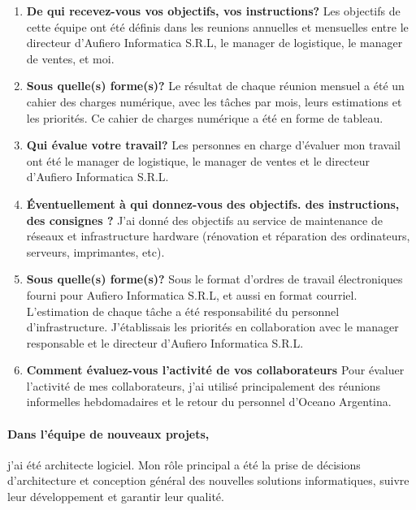 \documentclass{resume} %
\begin{document}
		\begin{enumerate}
		\item \textbf{De qui recevez-vous vos objectifs, vos instructions?}
			Les objectifs de cette équipe ont été définis dans les reunions annuelles et mensuelles entre le directeur d'Aufiero Informatica S.R.L, le manager de logistique, le manager de ventes, et moi.
		\item \textbf{Sous quelle(s) forme(s)?}
			Le résultat de chaque réunion mensuel a été un cahier des charges numérique, avec les tâches par mois, leurs estimations et les priorités. Ce cahier de charges numérique  a été en forme de tableau.
		\item \textbf{Qui évalue votre travail?}
			Les personnes en charge d'évaluer mon travail ont été  le manager de logistique, le manager de ventes et le directeur d'Aufiero Informatica S.R.L. 
		\item  \textbf{Éventuellement à qui donnez-vous des objectifs. des instructions, des consignes ?}
			J'ai donné des objectifs au service de maintenance de réseaux et infrastructure hardware (rénovation et réparation des ordinateurs, serveurs, imprimantes, etc).
		\item \textbf{Sous quelle(s) forme(s)?}
			Sous le format d'ordres de travail électroniques fourni pour Aufiero Informatica S.R.L, et aussi en format courriel. L'estimation de chaque tâche a été responsabilité du personnel d'infrastructure. 
			J'\'etablissais les priorités en collaboration avec le manager responsable et le directeur d'Aufiero Informatica S.R.L.  
		\item \textbf{Comment évaluez-vous l'activité de vos collaborateurs}
			Pour évaluer l'activité de mes collaborateurs, j'ai utilisé principalement des réunions informelles hebdomadaires et le retour du personnel d'Oceano Argentina. 
		\end{enumerate}
		
		\paragraph{Dans l'équipe de nouveaux projets,} j'ai été architecte logiciel. Mon rôle principal a été la  prise de décisions d'architecture et conception général des nouvelles solutions informatiques, suivre leur développement et garantir leur qualité. 
		
\end{document}
